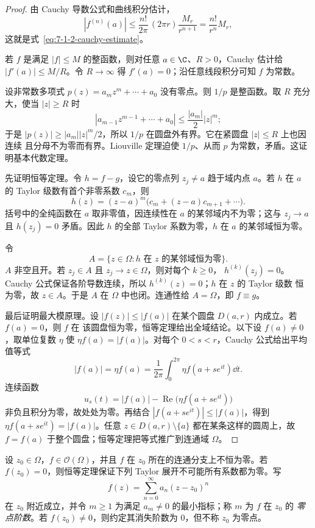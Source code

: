 \begin{proof}
由 Cauchy 导数公式和曲线积分估计，
\[
 |f^{(n)}(a)|
 \le\frac{n!}{2\pi}\,(2\pi r)\frac{M_r}{r^{n+1}}
 =\frac{n!}{r^n}M_r,
\]
这就是式~\eqref{eq:7-1-2-cauchy-estimate}。

若 $f$ 是满足 $|f|\le M$ 的整函数，则对任意 $a\in\C$、$R>0$，Cauchy 估计给
$|f'(a)|\le M/R$。令 $R\to\infty$ 得 $f'(a)=0$；沿任意线段积分可知 $f$ 为常数。

设非常数多项式 $p(z)=a_mz^m+\cdots+a_0$ 没有零点。则 $1/p$ 是整函数。取 $R$ 充分大，使当
$|z|\ge R$ 时
\[
 |a_{m-1}z^{m-1}+\cdots+a_0|
 \le\frac{|a_m|}{2}|z|^m;
\]
于是 $|p(z)|\ge |a_m||z|^m/2$，所以 $1/p$ 在圆盘外有界。它在紧圆盘 $|z|\le R$ 上也因连续
且分母不为零而有界。Liouville 定理迫使 $1/p$、从而 $p$ 为常数，矛盾。这证明基本代数定理。

先证明恒等定理。令 $h=f-g$，设它的零点列 $z_j\ne a$ 趋于域内点 $a$。若 $h$ 在 $a$ 的 Taylor
级数有首个非零系数 $c_m$，则
\[
 h(z)=(z-a)^m\bigl(c_m+(z-a)c_{m+1}+\cdots\bigr).
\]
括号中的全纯函数在 $a$ 取非零值，因连续性在 $a$ 的某邻域内不为零；这与 $z_j\to a$ 且
$h(z_j)=0$ 矛盾。因此 $h$ 的全部 Taylor 系数为零，$h$ 在 $a$ 的某邻域恒为零。

令
\[
 A=\{z\in\Omega:h\text{ 在 }z\text{ 的某邻域恒为零}\}.
\]
$A$ 非空且开。若 $z_j\in A$ 且 $z_j\to z\in\Omega$，则对每个 $k\ge0$，
$h^{(k)}(z_j)=0$。Cauchy 公式保证各阶导数连续，所以 $h^{(k)}(z)=0$；$h$ 在 $z$ 的 Taylor 级数
恒为零，故 $z\in A$。于是 $A$ 在 $\Omega$ 中也闭。连通性给 $A=\Omega$，即 $f\equiv g$。

最后证明最大模原理。设 $|f(z)|\le|f(a)|$ 在某个圆盘 $D(a,r)$ 内成立。若 $f(a)=0$，则 $f$ 在
该圆盘恒为零，恒等定理给出全域结论。以下设 $f(a)\ne0$，取单位复数 $\eta$ 使
$\eta f(a)=|f(a)|$。对每个 $0<s<r$，Cauchy 公式给出平均值等式
\[
 |f(a)|=\eta f(a)
 =\frac1{2\pi}\int_0^{2\pi}\eta f(a+se^{it})\dd t.
\]
连续函数
\[
 u_s(t)=|f(a)|-\operatorname{Re}\bigl(\eta f(a+se^{it})\bigr)
\]
非负且积分为零，故处处为零。再结合
$|f(a+se^{it})|\le|f(a)|$，得到
$\eta f(a+se^{it})=|f(a)|$。任意 $z\in D(a,r)\setminus\{a\}$ 都在某条这样的圆周上，故
$f=f(a)$ 于整个圆盘；恒等定理把等式推广到连通域 $\Omega$。
\end{proof}

\begin{definition}[零点阶数]\label{def:7-1-2-3}
设 $z_0\in\Omega$，$f\in\mathcal O(\Omega)$，并且 $f$ 在 $z_0$ 所在的连通分支上不恒为零。若
$f(z_0)=0$，则恒等定理保证下列 Taylor 展开不可能所有系数都为零。写
\[
 f(z)=\sum_{n=0}^{\infty}a_n(z-z_0)^n
\]
在 $z_0$ 附近成立，并令 $m\ge1$ 为满足 $a_m\ne0$ 的最小指标；称 $m$ 为 $f$ 在 $z_0$ 的
\emph{零点阶数}。若 $f(z_0)\ne0$，则约定其消失阶数为 $0$，但不称 $z_0$ 为零点。
\end{definition}


